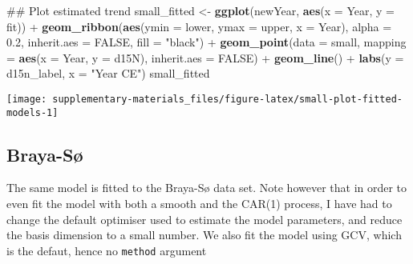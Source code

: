 \documentclass[12pt,]{article}
\newenvironment{Shaded}{\begin{snugshade}}{\end{snugshade}}
\newcommand{\KeywordTok}[1]{\textcolor[rgb]{0.13,0.29,0.53}{\textbf{{#1}}}}
\newcommand{\DataTypeTok}[1]{\textcolor[rgb]{0.13,0.29,0.53}{{#1}}}
\newcommand{\FloatTok}[1]{\textcolor[rgb]{0.00,0.00,0.81}{{#1}}}
\newcommand{\StringTok}[1]{\textcolor[rgb]{0.31,0.60,0.02}{{#1}}}
\newcommand{\OtherTok}[1]{\textcolor[rgb]{0.56,0.35,0.01}{{#1}}}
\newcommand{\NormalTok}[1]{{#1}}
\begin{document}
\begin{Shaded}
\begin{Highlighting}[]
\NormalTok{## Plot estimated trend}
\NormalTok{small_fitted <-}\StringTok{ }\KeywordTok{ggplot}\NormalTok{(newYear, }\KeywordTok{aes}\NormalTok{(}\DataTypeTok{x =} \NormalTok{Year, }\DataTypeTok{y =} \NormalTok{fit)) +}
\StringTok{    }\KeywordTok{geom_ribbon}\NormalTok{(}\KeywordTok{aes}\NormalTok{(}\DataTypeTok{ymin =} \NormalTok{lower, }\DataTypeTok{ymax =} \NormalTok{upper, }\DataTypeTok{x =} \NormalTok{Year), }\DataTypeTok{alpha =} \FloatTok{0.2}\NormalTok{,}
                \DataTypeTok{inherit.aes =} \OtherTok{FALSE}\NormalTok{, }\DataTypeTok{fill =} \StringTok{"black"}\NormalTok{) +}
\StringTok{    }\KeywordTok{geom_point}\NormalTok{(}\DataTypeTok{data =} \NormalTok{small, }\DataTypeTok{mapping =} \KeywordTok{aes}\NormalTok{(}\DataTypeTok{x =} \NormalTok{Year, }\DataTypeTok{y =} \NormalTok{d15N),}
               \DataTypeTok{inherit.aes =} \OtherTok{FALSE}\NormalTok{) +}
\StringTok{    }\KeywordTok{geom_line}\NormalTok{() +}
\StringTok{    }\KeywordTok{labs}\NormalTok{(}\DataTypeTok{y =} \NormalTok{d15n_label, }\DataTypeTok{x =} \StringTok{"Year CE"}\NormalTok{)}
\NormalTok{small_fitted}
\end{Highlighting}
\end{Shaded}

\begin{center}\texttt{[image: supplementary-materials\_files/figure-latex/small-plot-fitted-models-1]} \end{center}

\subsection{Braya-Sø}\label{braya-s}

The same model is fitted to the Braya-Sø data set. Note however that in
order to even fit the model with both a smooth and the CAR(1) process, I
have had to change the default optimiser used to estimate the model
parameters, and reduce the basis dimension to a small number. We also
fit the model using GCV, which is the defaut, hence no \texttt{method}
argument
\end{document}
